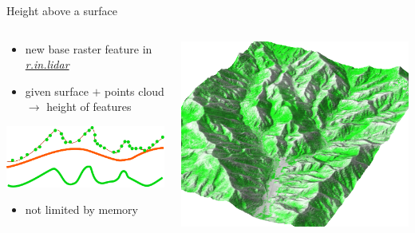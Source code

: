 \documentclass[xcolor={dvipsnames,usenames},beamer,aspectratio=169]{beamer}
\newcommand{\gmodule}[1]{\href{http://grass.osgeo.org/grass71/manuals/#1.html}{\emph{#1}}}
\begin{document}
\begin{frame}{Height above a surface}

\begin{columns}
\begin{column}{0.4\textwidth}

\begin{itemize}
  \item new base raster feature in \gmodule{r.in.lidar}
  \item given surface $+$ points cloud\\
    $\longrightarrow$ height of features
\end{itemize}

\medskip

\begin{center}
\includegraphics[width=\textwidth]{images/features/base_raster}
\end{center}

\begin{itemize}
  \item \small not limited by memory
\end{itemize}

\end{column}
\begin{column}{0.55\textwidth}

\begin{center}
  \includegraphics[width=\textwidth]{grass/max_height_10m_on_ground_from_neighbors_smaller_area_top}
\end{center}


\end{column}
\end{columns}
\end{frame}
\end{document}

